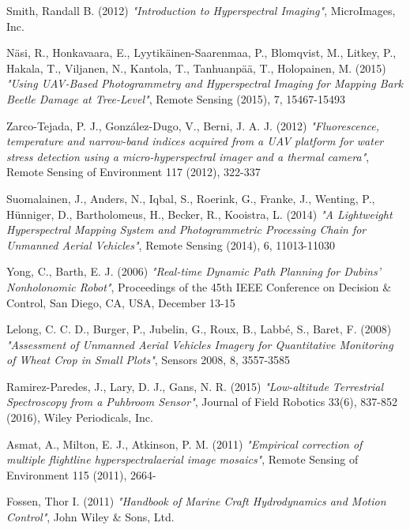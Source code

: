 \begin{thebibliography}{25}
	
	Smith, Randall B. (2012)
	\emph{"Introduction to Hyperspectral Imaging"},
	MicroImages, Inc.
	
	Näsi, R., Honkavaara, E., Lyytikäinen-Saarenmaa, P., Blomqvist, M., Litkey, P., Hakala, T., Viljanen, N., Kantola, T., Tanhuanpää, T., Holopainen, M. (2015)
	\emph{"Using UAV-Based Photogrammetry and Hyperspectral Imaging for Mapping Bark Beetle Damage at Tree-Level"},
	Remote Sensing (2015), 7, 15467-15493
	
	Zarco-Tejada, P. J., González-Dugo, V., Berni, J. A. J. (2012)
	\emph{"Fluorescence, temperature and narrow-band indices acquired from a UAV platform for water stress detection using a micro-hyperspectral imager and a thermal camera"},
	Remote Sensing of Environment 117 (2012), 322-337
	
	Suomalainen, J., Anders, N., Iqbal, S., Roerink, G., Franke, J., Wenting, P., Hünniger, D., Bartholomeus, H., Becker, R., Kooistra, L. (2014)
	\emph{"A Lightweight Hyperspectral Mapping System and Photogrammetric Processing Chain for Unmanned Aerial Vehicles"},
	Remote Sensing (2014), 6, 11013-11030
	
	
	Yong, C., Barth, E. J. (2006)
	\emph{"Real-time Dynamic Path Planning for Dubins' Nonholonomic Robot"},
	Proceedings of the 45th IEEE Conference on Decision \& Control, San Diego, CA, USA, December 13-15
	
	
	Lelong, C. C. D., Burger, P., Jubelin, G., Roux, B., Labbé, S., Baret, F. (2008)
	\emph{"Assessment of Unmanned Aerial Vehicles Imagery for Quantitative Monitoring of Wheat Crop in Small Plots"},
	Sensors 2008, 8, 3557-3585
	
	Ramirez-Paredes, J., Lary, D. J., Gans, N. R. (2015)
	\emph{"Low-altitude Terrestrial Spectroscopy from a Puhbroom Sensor"},
	Journal of Field Robotics 33(6), 837-852 (2016), Wiley Periodicals, Inc.
	
	Asmat, A., Milton, E. J., Atkinson, P. M. (2011)
	\emph{"Empirical correction of multiple flightline hyperspectralaerial image mosaics"},
	Remote Sensing of Environment 115 (2011), 2664-
	
	
	Fossen, Thor I. (2011)
	\emph{"Handbook of Marine Craft Hydrodynamics and Motion Control"},
	John Wiley \& Sons, Ltd.
	
	
\end{thebibliography}